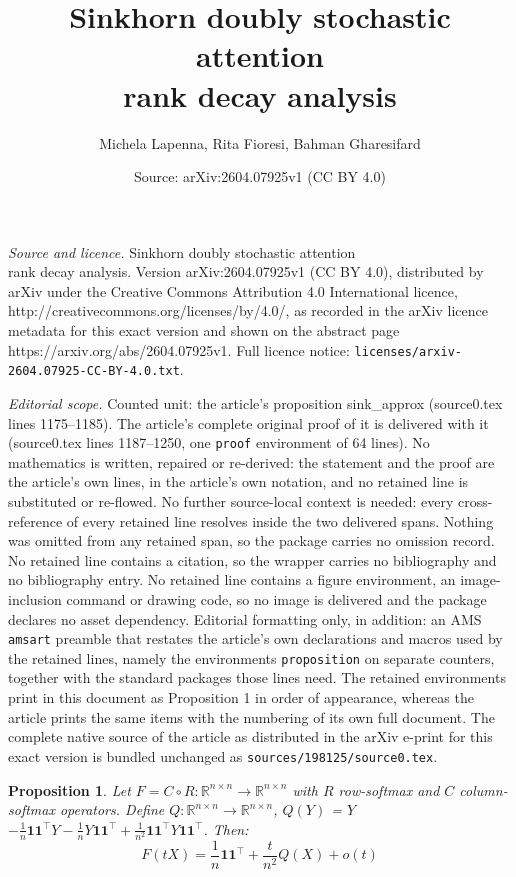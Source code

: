 \documentclass[10pt,a4paper]{amsart}
\title{Sinkhorn doubly stochastic attention \\rank decay analysis}
\author{Michela Lapenna, Rita Fioresi, Bahman Gharesifard}
\date{Source: arXiv:2604.07925v1 (CC BY 4.0)}
\newtheorem{proposition}{Proposition}
\newcommand{\R}{\mathbb{R}}
\newcommand{\lra}{\longrightarrow}
\begin{document}
\maketitle

\noindent\emph{Source and licence.} Sinkhorn doubly stochastic attention \\rank decay analysis. Version arXiv:2604.07925v1 (CC BY 4.0), distributed by arXiv under the Creative Commons Attribution 4.0 International licence, http://creativecommons.org/licenses/by/4.0/, as recorded in the arXiv licence metadata for this exact version and shown on the abstract page https://arxiv.org/abs/2604.07925v1. Full licence notice: \texttt{licenses/arxiv-2604.07925-CC-BY-4.0.txt}.\par\smallskip

\noindent\textit{Editorial scope.} Counted unit: the article's proposition sink\_approx (source0.tex lines 1175--1185). The article's complete original proof of it is delivered with it (source0.tex lines 1187--1250, one \texttt{proof} environment of 64 lines). No mathematics is written, repaired or re-derived: the statement and the proof are the article's own lines, in the article's own notation, and no retained line is substituted or re-flowed.  No further source-local context is needed: every cross-reference of every retained line resolves inside the two delivered spans.  Nothing was omitted from any retained span, so the package carries no omission record.  No retained line contains a citation, so the wrapper carries no bibliography and no bibliography entry.  No retained line contains a figure environment, an image-inclusion command or drawing code, so no image is delivered and the package declares no asset dependency.  Editorial formatting only, in addition: an AMS \texttt{amsart} preamble that restates the article's own declarations and macros used by the retained lines, namely the environments \texttt{proposition} on separate counters, together with the standard packages those lines need.  The retained environments print in this document as Proposition 1 in order of appearance, whereas the article prints the same items with the numbering of its own full document.  The complete native source of the article as distributed in the arXiv e-print for this exact version is bundled unchanged as \texttt{sources/198125/source0.tex}.
\begin{proposition}\label{sink_approx}
Let $F=C \circ R: \R^{n\times n} \lra \R^{n\times n}$ with $R$ row-softmax and $C$ column-softmax operators. Define $Q:\R^{n\times n} \lra \R^{n\times n}$,
$Q(Y) $ = $ Y$
$- \frac{1}{n} \mathbf{1}\mathbf{1}^\top Y
- \frac{1}{n} Y \mathbf{1}\mathbf{1}^\top
+ \frac{1}{n^2} \mathbf{1}\mathbf{1}^\top Y \mathbf{1}\mathbf{1}^\top$.
Then:
\begin{equation}\label{f-op}
F(tX)=\frac{1}{n}\mathbf{1}\mathbf{1}^\top+\frac{t}{n^2}Q(X)+o(t)
\end{equation}
\end{proposition}
\end{document}
